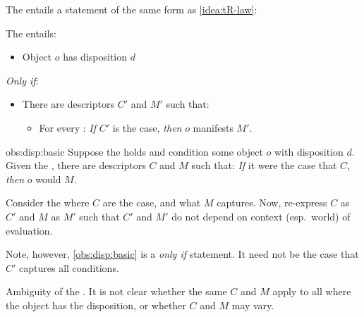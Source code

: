 \begin{note}
  The  entails a statement of the same form as \autoref{idea:tR-law}:

  \begin{proposition}
    \label{obs:disp:basic}
    The  entails:

    \begin{itemize}
    \item
      Object \(o\) has disposition \(d\)
    \end{itemize}

    \emph{Only if}:

    \begin{itemize}
    \item
      There are descriptors \(C'\) and \(M'\) such that:
      \begin{itemize}
      \item
        For every :
        \emph{If} \(C'\) is the case, \emph{then} \(o\) manifests \(M'\).
      \end{itemize}
    \end{itemize}
    \vspace{-\baselineskip}
  \end{proposition}

  \begin{argument}{obs:disp:basic}
    Suppose the  holds and condition some object \(o\) with disposition \(d\).
    Given the , there are descriptors \(C\) and \(M\) such that:
    \emph{If} it were the case that \(C\), \emph{then} \(o\) would \(M\).

    Consider the  where \(C\) are the case, and what \(M\) captures.
    Now, re-express \(C\) as \(C'\) and \(M\) as \(M'\) such that \(C'\) and \(M'\) do not depend on context (esp.\ world) of evaluation.
  \end{argument}

  Note, however, \autoref{obs:disp:basic} is a \emph{only if} statement.
  It need not be the case that \(C'\) captures all conditions.

  Ambiguity of the \dBCA{}.
  It is not clear whether the same \(C\) and \(M\) apply to all  where the object has the disposition, or whether \(C\) and \(M\) may vary.
\end{note}

